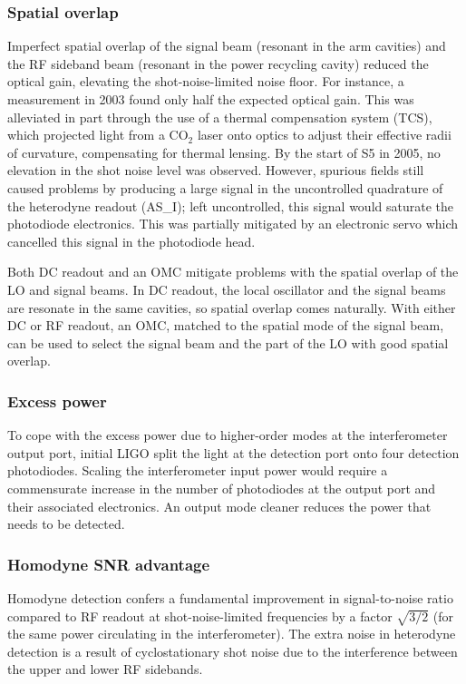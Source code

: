 \subsubsection*{Spatial overlap}  
Imperfect spatial overlap of the signal beam (resonant in the arm
cavities) and the RF sideband beam (resonant in the power recycling
cavity) reduced the optical gain, elevating the shot-noise-limited
noise floor. For instance, a measurement in 2003 found only half the
expected optical gain\cite{Fritschel2003Shot}.  This was alleviated in
part through the use of a thermal compensation system (TCS), which
projected light from a CO$_2$ laser onto optics to adjust their
effective radii of curvature, compensating for thermal lensing.  By
the start of S5 in 2005, no elevation in the shot noise level was
observed\cite{Ballmer2006LIGO}.  However, spurious fields still caused
problems by producing a large signal in the uncontrolled quadrature of
the heterodyne readout (AS\_I); left uncontrolled, this signal would
saturate the photodiode electronics.  This was partially mitigated by
an electronic servo which cancelled this signal in the photodiode
head.

Both DC readout and an OMC mitigate problems with the spatial overlap
of the LO and signal beams.  In DC readout, the local oscillator and
the signal beams are resonate in the same cavities, so spatial overlap
comes naturally.  With either DC or RF readout, an OMC, matched to the
spatial mode of the signal beam, can be used to select the signal beam
and the part of the LO with good spatial overlap.

\subsubsection*{Excess power}
To cope with the excess power due to higher-order modes at the
interferometer output port, initial LIGO split the light at the
detection port onto four detection photodiodes.  Scaling the
interferometer input power would require a commensurate increase in
the number of photodiodes at the output port and their associated
electronics.  An output mode cleaner reduces the power that needs to
be detected.

\subsubsection*{Homodyne SNR advantage} 
Homodyne detection confers a fundamental improvement in
signal-to-noise ratio compared to RF readout at shot-noise-limited
frequencies by a factor $\sqrt{3/2}$ (for the same power circulating
in the interferometer).  The extra noise in heterodyne detection is a
result of cyclostationary shot noise\cite{Niebauer1991Nonstationary}
due to the interference between the upper and lower RF sidebands.

